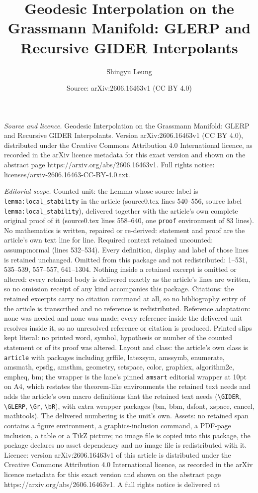 \documentclass[10pt,a4paper]{amsart}
\title[Geodesic Interpolation on the Grassmann Manifold: GLERP and ]{Geodesic Interpolation on the Grassmann Manifold: GLERP and Recursive GIDER Interpolants}
\author{Shingyu Leung}
\date{Source: arXiv:2606.16463v1 (CC BY 4.0)}
\begin{document}
\maketitle

\noindent\emph{Source and licence.} Geodesic Interpolation on the Grassmann Manifold: GLERP and Recursive GIDER Interpolants. Version arXiv:2606.16463v1 (CC BY 4.0), distributed under the Creative Commons Attribution 4.0 International licence, as recorded in the arXiv licence metadata for this exact version and shown on the abstract page https://arxiv.org/abs/2606.16463v1. Full rights notice: licenses/arxiv-2606.16463-CC-BY-4.0.txt.\par\smallskip

\noindent\textit{Editorial scope.} Counted unit: the Lemma whose source label is \texttt{lemma:local\_stability} in the article (source0.tex lines 540--556, source label \texttt{lemma:local\_stability}), delivered together with the article's own complete original proof of it (source0.tex lines 558--640, one \texttt{proof} environment of 83 lines). No mathematics is written, repaired or re-derived: statement and proof are the article's own text line for line. Required context retained uncounted: assump:normal (lines 532--534). Every definition, display and label of those lines is retained unchanged. Omitted from this package and not redistributed: 1--531, 535--539, 557--557, 641--1304. Nothing inside a retained excerpt is omitted or altered: every retained body is delivered exactly as the article's lines are written, so no omission receipt of any kind accompanies this package. Citations: the retained excerpts carry no citation command at all, so no bibliography entry of the article is transcribed and no reference is redistributed. Reference adaptation: none was needed and none was made; every reference inside the delivered unit resolves inside it, so no unresolved reference or citation is produced. Printed slips kept literal: no printed word, symbol, hypothesis or number of the counted statement or of its proof was altered. Layout and class: the article's own class is \texttt{article} with packages including grffile, latexsym, amssymb, enumerate, amsmath, epsfig, amsthm, geometry, setspace, color, graphicx, algorithm2e, empheq, bm; the wrapper is the lane's pinned \texttt{amsart} editorial wrapper at 10pt on A4, which restates the theorem-like environments the retained text needs and adds the article's own macro definitions that the retained text needs (\texttt{\textbackslash GIDER}, \texttt{\textbackslash GLERP}, \texttt{\textbackslash Gr}, \texttt{\textbackslash bR}), with extra wrapper packages (bm, bbm, dsfont, xspace, cancel, mathtools). The delivered numbering is the unit's own. Assets: no retained span contains a figure environment, a graphics-inclusion command, a PDF-page inclusion, a table or a TikZ picture; no image file is copied into this package, the package declares no asset dependency and no image file is redistributed with it. Licence: version arXiv:2606.16463v1 of this article is distributed under the Creative Commons Attribution 4.0 International licence, as recorded in the arXiv licence metadata for this exact version and shown on the abstract page https://arxiv.org/abs/2606.16463v1. A full rights notice is delivered at 
\end{document}
